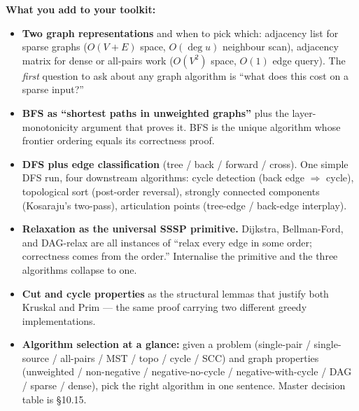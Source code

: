 \documentclass[11pt]{article}
\begin{document}
\begin{ideabox}
\textbf{What you add to your toolkit:}
\begin{itemize}
    \item \textbf{Two graph representations} and when to pick which:
          adjacency list for sparse graphs ($O(V+E)$ space,
          $O(\deg u)$ neighbour scan), adjacency matrix for dense or
          all-pairs work ($O(V^2)$ space, $O(1)$ edge query). The
          \emph{first} question to ask about any graph algorithm is
          ``what does this cost on a sparse input?''
    \item \textbf{BFS as ``shortest paths in unweighted graphs''}
          plus the layer-monotonicity argument that proves it.
          BFS is the unique algorithm whose frontier ordering equals
          its correctness proof.
    \item \textbf{DFS plus edge classification} (tree / back / forward
          / cross). One simple DFS run, four downstream algorithms:
          cycle detection (back edge $\Rightarrow$ cycle),
          topological sort (post-order reversal), strongly connected
          components (Kosaraju's two-pass), articulation points
          (tree-edge / back-edge interplay).
    \item \textbf{Relaxation as the universal SSSP primitive.}
          Dijkstra, Bellman-Ford, and DAG-relax are all instances of
          ``relax every edge in some order; correctness comes from
          the order.'' Internalise the primitive and the three
          algorithms collapse to one.
    \item \textbf{Cut and cycle properties} as the structural lemmas
          that justify both Kruskal and Prim --- the same proof
          carrying two different greedy implementations.
    \item \textbf{Algorithm selection at a glance:} given a problem
          (single-pair / single-source / all-pairs / MST / topo /
          cycle / SCC) and graph properties (unweighted /
          non-negative / negative-no-cycle / negative-with-cycle /
          DAG / sparse / dense), pick the right algorithm in one
          sentence. Master decision table is \S10.15.
\end{itemize}


\end{ideabox}
\end{document}
